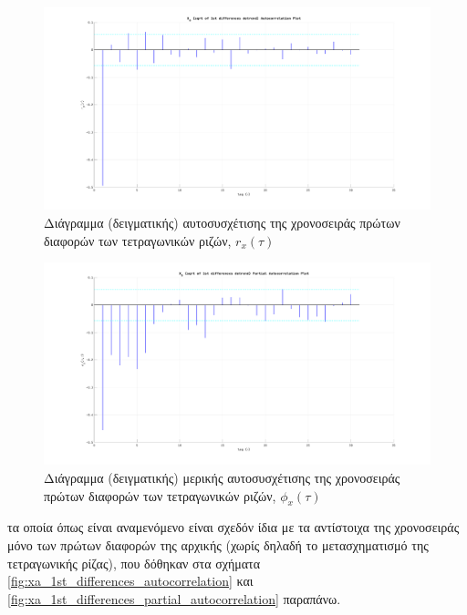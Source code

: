 \begin{figure}[H]
    \begin{center}
        \includegraphics[width=\textwidth]{assets/images/plots/xa_sqrt_of_1st_differences_autocorrelation.svg.pdf}
        \caption{Διάγραμμα (δειγματικής) αυτοσυσχέτισης της χρονοσειράς πρώτων διαφορών των τετραγωνικών ριζών, $r_x(\tau)$}
        \label{fig:xa_sqrt_of_1st_differences_autocorrelation}
    \end{center}
\end{figure}

\begin{figure}[H]
    \begin{center}
        \includegraphics[width=\textwidth]{assets/images/plots/xb_sqrt_of_1st_differences_partial_autocorrelation.svg.pdf}
        \caption{Διάγραμμα (δειγματικής) μερικής αυτοσυσχέτισης της χρονοσειράς πρώτων διαφορών των τετραγωνικών ριζών, $\phi_x(\tau)$}
        \label{fig:xb_sqrt_of_1st_differences_partial_autocorrelation}
    \end{center}
\end{figure}

τα οποία όπως είναι αναμενόμενο είναι σχεδόν ίδια με τα αντίστοιχα της χρονοσειράς μόνο των πρώτων διαφορών της αρχικής (χωρίς δηλαδή το μετασχηματισμό της τετραγωνικής ρίζας), που δόθηκαν στα σχήματα \ref{fig:xa_1st_differences_autocorrelation} και \ref{fig:xa_1st_differences_partial_autocorrelation} παραπάνω.

